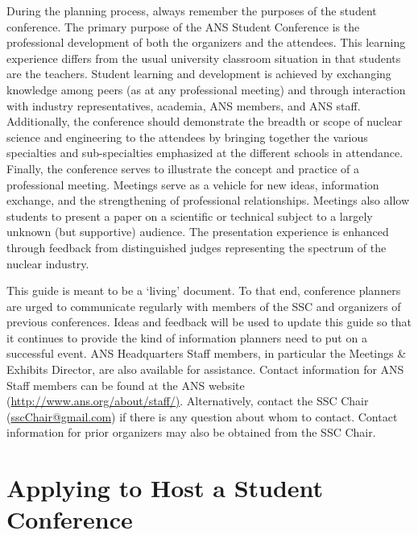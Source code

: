 \documentclass[12pt]{article}
\begin{document}
During the planning process, always remember the purposes of the student conference.
The primary purpose of the ANS Student Conference is the professional development of both the organizers and the attendees.
This learning experience differs from the usual university classroom situation in that students are the teachers.
Student learning and development is achieved by exchanging knowledge among peers (as at any professional meeting) and through interaction with industry representatives, academia, ANS members, and ANS staff.
Additionally, the conference should demonstrate the breadth or scope of nuclear science and engineering to the attendees by bringing together the various specialties and sub-specialties emphasized at the different schools in attendance.
Finally, the conference serves to illustrate the concept and practice of a professional meeting.
Meetings serve as a vehicle for new ideas, information exchange, and the strengthening of professional relationships.
Meetings also allow students to present a paper on a scientific or technical subject to a largely unknown (but supportive) audience.
The presentation experience is enhanced through feedback from distinguished judges representing the spectrum of the nuclear industry.

This guide is meant to be a `living' document.
To that end, conference planners are urged to communicate regularly with members of the SSC and organizers of previous conferences.
Ideas and feedback will be used to update this guide so that it continues to provide the kind of information planners need to put on a successful event.
ANS Headquarters Staff members, in particular the Meetings \& Exhibits Director, are also available for assistance.
Contact information for ANS Staff members can be found at the ANS website (\href{http://www.ans.org/about/staff/}{http://www.ans.org/about/staff/)}.
Alternatively, contact the SSC Chair \mbox{(\href{mailto:sscChair@gmail.com}{sscChair@gmail.com})} if there is any question about whom to contact.
Contact information for prior organizers may also be obtained from the SSC Chair.

\section{Applying to Host a Student Conference}
\end{document}
